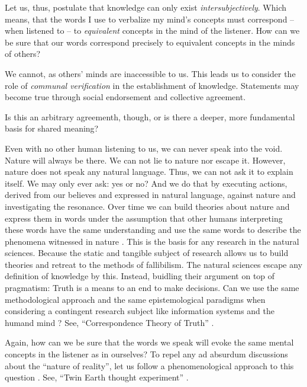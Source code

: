 Let us, thus, postulate that knowledge can only exist \textit{intersubjectively}.
Which means, that the words I use to verbalize my mind's concepts must correspond -- when listened to -- to \textit{equivalent} concepts in the mind of the listener.
How can we be sure that our words correspond precisely to equivalent concepts in the minds of others?

We cannot, as others' minds are inaccessible to us.
This leads us to consider the role of \textit{communal verification} in the establishment of knowledge.
Statements may become true through social endorsement and collective agreement.

Is this an arbitrary agreementh, though, or is there a deeper, more fundamental basis for shared meaning?

\gap

Even with no other human listening to us, we can never speak into the void.
Nature will always be there.
We can not lie to nature nor escape it.
However, nature does not speak any natural language.
Thus, we can not ask it to explain itself.
We may only ever ask: yes or no?
And we do that by executing actions, derived from our believes and expressed in natural language, against nature and investigating the resonance.
Over time we can build theories about nature and express them in words under the assumption that other humans interpreting these words have the same understanding and use the same words to describe the phenomena witnessed in nature \parencite[1011b]{aristotle-33}.
This is the basis for any research in the natural sciences.
Because the static and tangible subject of research allows us to build theories and retreat to the methods of fallibilism.
The natural sciences escape any definition of knowledge by this.
Instead, buidling their argument on top of pragmatism: Truth is a means to an end to make decisions.
Can we use the same methodological approach and the same epistemological paradigms when considering a contingent research subject like information systems and the humand mind \parencite{frank-07}?
See, \enquote{Correspondence Theory of Truth} \parencite{david-22}.

Again, how can we be sure that the words we speak will evoke the same mental concepts in the listener as in ourselves?
To repel any ad absurdum discussions about the \enquote{nature of reality}, let us follow a phenomenological approach to this question \parencite{husserl-02}.
See, \enquote{Twin Earth thought experiment} \parencite{putnam-73}.

